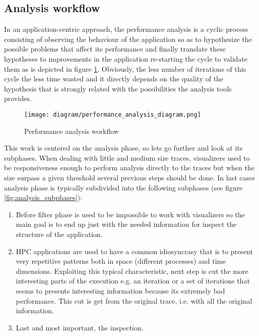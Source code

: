 \subsection{Analysis workflow}\label{ss:analysis_workflow}

In an application-centric approach, the performance analysis is a cyclic process 
consisting of observing the behaviour of the application so as to hypothesize the 
possible problems that affect its performance and finally translate these 
hypotheses to improvements in the application re-starting the cycle to validate 
them as is depicted in figure \ref{fig:perf_analysis_workflow}. Obviously, the 
less number of iterations of this cycle the less time wasted and it directly 
depends on the quality of the hypothesis that is strongly related with the 
possibilities the analysis tools provides.

\begin{figure}[]
  \centering
  \texttt{[image: diagram/performance\_analysis\_diagram.png]}
  \caption{Performance analysis workflow}
  \label{fig:perf_analysis_workflow}
\end{figure}

This work is centered on the analysis phase, so lets go further and look at its
subphases. When dealing with little and medium size traces, visualizers used to
be responsiveness enough to perform analysis directly to the traces but when the 
size surpass a given threshold several previous steps should be done. In last 
cases analysis phase is typically subdivided into the following 
subphases (see figure \ref{fig:analysis_subphases}):
\begin{enumerate}[label=\roman*)]
  \item Before filter phase is
    used to be impossible to work with visualizers so the main goal is to end up
    just with the needed information for inspect the structure of the
    application.
  \item HPC applications are used to have a common idiosyncrasy that is to
    present very repetitive patterns both in space (different processes) and 
    time dimensions. Exploiting this typical characteristic, next step is cut
    the more interesting parts of the execution e.g. an iteration or a set of
    iterations that seems to presents interesting information because its 
    extremely bad performance. This cut is get from the original trace, i.e.
    with all the original information.
  \item Last and most important, the inspection. 
\end{enumerate}


